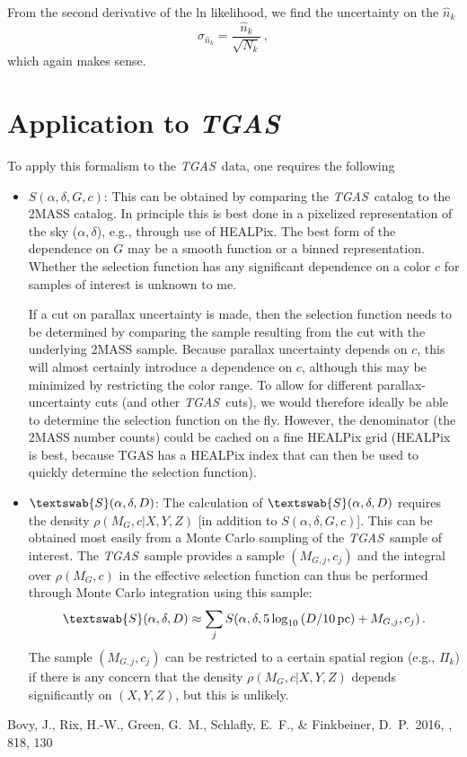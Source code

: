 \documentclass[12pt,preprint]{aastex}
\newcommand{\etal}{et al.}
\newcommand{\eg}{e.g.}
\newcommand{\tgas}{\emph{TGAS}}
\newcommand{\ra}{\ensuremath{\alpha}}
\newcommand{\dec}{\ensuremath{\delta}}
\newcommand{\essf}{\ensuremath{\textswab{S}}}
\newcommand{\pc}{\ensuremath{\,\mathrm{pc}}}
\begin{document}
From the second derivative of the ln likelihood, we find the
uncertainty on the $\hat{n}_k$
\begin{equation}
  \sigma_{\hat{n}_k} = \frac{\hat{n}_k}{\sqrt{N_k}}\,,
\end{equation}
which again makes sense.

\section{Application to \tgas}

To apply this formalism to the \tgas\ data, one requires the following
\begin{itemize}
  \item $S(\ra,\dec,G,c)$: This can be obtained by comparing the
    \tgas\ catalog to the 2MASS catalog. In principle this is best
    done in a pixelized representation of the sky ($\ra,\dec$), \eg,
    through use of HEALPix. The best form of the dependence on $G$ may
    be a smooth function or a binned representation. Whether the
    selection function has any significant dependence on a color $c$
    for samples of interest is unknown to me.

    If a cut on parallax uncertainty is made, then the selection
    function needs to be determined by comparing the sample resulting
    from the cut with the underlying 2MASS sample. Because parallax
    uncertainty depends on $c$, this will almost certainly introduce a
    dependence on $c$, although this may be minimized by restricting
    the color range. To allow for different parallax-uncertainty cuts
    (and other \tgas\ cuts), we would therefore ideally be able to
    determine the selection function on the fly. However, the
    denominator (the 2MASS number counts) could be cached on a fine
    HEALPix grid (HEALPix is best, because TGAS has a HEALPix index
    that can then be used to quickly determine the selection
    function).
  \item $\essf(\ra,\dec,D)$: The calculation of $\essf(\ra,\dec,D)$
    requires the density $\rho(M_G,c|X,Y,Z)$ [in addition to
      $S(\ra,\dec,G,c)$]. This can be obtained most easily from a
    Monte Carlo sampling of the \tgas\ sample of interest. The
    \tgas\ sample provides a sample $(M_{G,j},c_j)$ and the integral
    over $\rho(M_G,c)$ in the effective selection function can thus be
    performed through Monte Carlo integration using this sample:
    \begin{equation}
      \essf(\ra,\dec,D) \approx \sum_j S(\ra,\dec,5\log_{10}\left(D/10\pc\right)+M_{G,j},c_j)\,.
    \end{equation}
    The sample $(M_{G,j},c_j)$ can be restricted to a certain spatial
    region (\eg, $\Pi_k$) if there is any concern that the density
    $\rho(M_G,c|X,Y,Z)$ depends significantly on $(X,Y,Z)$, but this
    is unlikely.
\end{itemize}

\begin{thebibliography}{}
\bibitem[Bovy \etal(2016)]{Bovy16a} Bovy, J., Rix, H.-W., Green,
  G.~M., Schlafly, E.~F., \& Finkbeiner, D.~P.\ 2016, \apj, 818, 130
\end{thebibliography}
\end{document}
